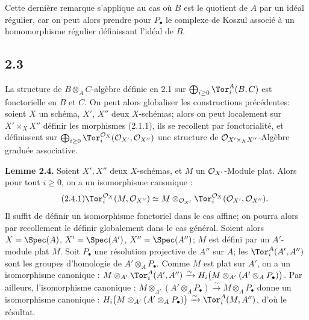 Cette dernière remarque s'applique au cas où \(B\) est le quotient de \(A\) par un idéal régulier, car on peut alors prendre pour \(P_\bullet\) le complexe de Koszul associé à un homomorphisme régulier définissant l'idéal de \(B\).

\subsection*{2.3}
La structure de \(B\otimes_A C\)-algèbre définie en 2.1 sur \(\bigoplus_{i\ge0}\Tor_i^A(B,C)\) est fonctorielle en \(B\) et \(C\). On peut alors globaliser les constructions précédentes: soient \(X\) un schéma, \(X'\), \(X''\) deux \(X\)-schémas; alors on peut localement sur \(X'\times_X X''\) définir les morphismes (2.1.1), ils se recollent par fonctorialité, et définissent sur \(\bigoplus_{i\ge0}\Tor_i^{\cO_X}(\cO_{X'},\cO_{X''})\) une structure de \(\mathcal O_{X'\times_X X''}\)-Algèbre graduée associative.

\textbf{Lemme 2.4.} Soient \(X',X''\) deux \(X\)-schémas, et \(M\) un \(\mathcal O_{X'}\)-Module plat. Alors pour tout \(i\ge0\), on a un isomorphisme canonique :
\begin{equation}\tag{2.4.1}
\Tor_i^{\cO_X}(M,\cO_{X''})\simeq
M\otimes_{\cO_{X'}}\Tor_i^{\cO_X}(\cO_{X'},\cO_{X''}).
\end{equation}
Il suffit de définir un isomorphisme fonctoriel dans le cas affine; on pourra alors par recollement le définir globalement dans le cas général. Soient alors \(X=\Spec(A)\), \(X'=\Spec(A')\), \(X''=\Spec(A'')\); \(M\) est défini par un \(A'\)-module plat \(M\). Soit \(P_\bullet\) une résolution projective de \(A''\) sur \(A\); les \(\Tor_i^A(A',A'')\) sont les groupes d'homologie de \(A'\otimes_A P_\bullet\). Comme \(M\) est plat sur \(A'\), on a un isomorphisme canonique : \(M\otimes_{A'}\Tor_i^A(A',A'')\xrightarrow{\sim}H_i\bigl(M\otimes_{A'}(A'\otimes_A P_\bullet)\bigr)\). Par ailleurs, l'isomorphisme canonique : \(M\otimes_{A'}(A'\otimes_A P_\bullet)\xrightarrow{\sim}M\otimes_A P_\bullet\) donne un isomorphisme canonique : \(H_i\bigl(M\otimes_{A'}(A'\otimes_A P_\bullet)\bigr)\xrightarrow{\sim}\Tor_i^A(M,A'')\), d'où le résultat.


